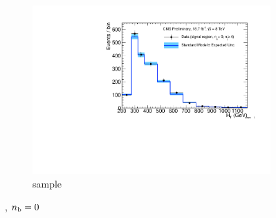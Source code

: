 \begin{figure}[h!]
\begin{subfigure}[b]{0.48\textwidth}
    \includegraphics[width=\textwidth,page=6]
    {Figs/results/v0/blueBand/bestFit_2012dev_RQcdZero_fZinvAll_0b_ge4j-12hp_smOnly}
    \caption{\gj sample}
  \end{subfigure}
  \caption{\njhigh, $n_{\text{b}} = 0$}
  \label{fig:blue_fits_0b_ge4j}
\end{figure}

